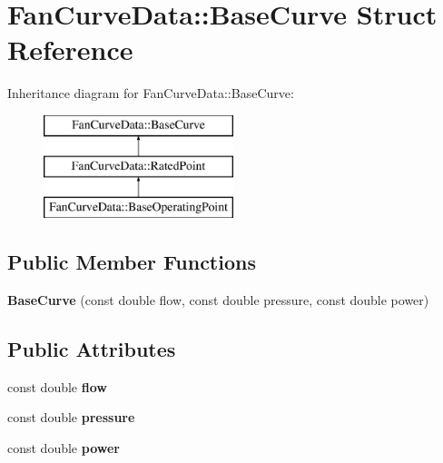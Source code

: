 \hypertarget{struct_fan_curve_data_1_1_base_curve}{}\section{Fan\+Curve\+Data\+:\+:Base\+Curve Struct Reference}
\label{struct_fan_curve_data_1_1_base_curve}
Inheritance diagram for Fan\+Curve\+Data\+:\+:Base\+Curve\+:\begin{figure}[H]
\begin{center}
\leavevmode
\includegraphics[height=3.000000cm]{da/d6e/struct_fan_curve_data_1_1_base_curve}
\end{center}
\end{figure}
\subsection*{Public Member Functions}
\begin{DoxyCompactItemize}
\item 
\mbox{\label{struct_fan_curve_data_1_1_base_curve_a05d0e881e03368efcbab71997ff25f33}} 
{\bfseries Base\+Curve} (const double flow, const double pressure, const double power)
\end{DoxyCompactItemize}
\subsection*{Public Attributes}
\begin{DoxyCompactItemize}
\item 
\mbox{\label{struct_fan_curve_data_1_1_base_curve_ab8b4cb389033aa5b58b49cebd8b672c6}} 
const double {\bfseries flow}
\item 
\mbox{\label{struct_fan_curve_data_1_1_base_curve_a100c4a42e149760c3f3722dce0b679a3}} 
const double {\bfseries pressure}
\item 
\mbox{\label{struct_fan_curve_data_1_1_base_curve_a4282ce2c8fa4150ecf011c9edaa7cb9d}} 
const double {\bfseries power}
\end{DoxyCompactItemize}
